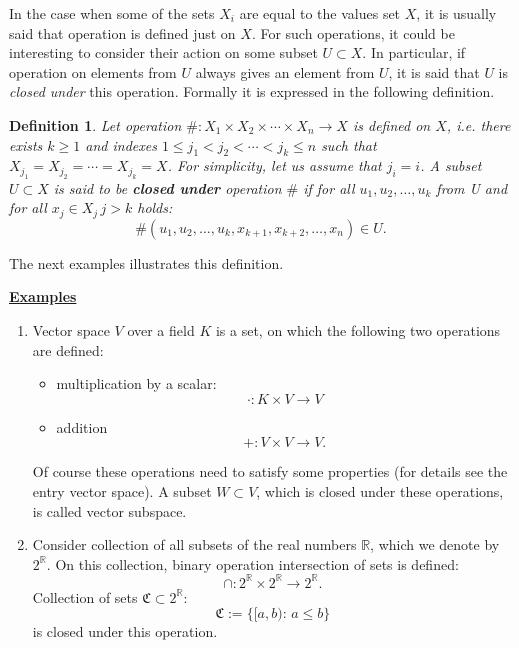 \documentclass[12pt]{article}
\newtheorem{dfn}{Definition}
\begin{document}
In the case when some of the sets $X_i$ are equal to the values set $X$, it is usually said
that operation is defined just on $X$. For such operations, it could be interesting
to consider their action on some subset $U\subset X$. In particular,
if operation on elements from $U$ always gives an element from $U$, it is said that $U$
is \textit{closed under} this operation. Formally it is expressed in the following definition.

\begin{dfn}
    Let operation $\#\colon X_1\times X_2\times\cdots\times X_n \longrightarrow X$ is defined
    on $X$, i.e. there exists $k\geq 1$ and indexes $1\leq j_1 < j_2 < \cdots < j_k\leq n$
    such that $X_{j_1}=X_{j_2}=\cdots=X_{j_k}=X$. For simplicity, let us assume that $j_i=i$.
    A subset $U\subset X$ is said to be \textbf{closed under} operation $\#$ if
    for all $u_1,u_2,\ldots,u_k$ from U and for all $x_j\in X_j\, j>k$ holds:
    $$
        \#(u_1,u_2,\ldots,u_k,x_{k+1},x_{k+2},\ldots,x_n)\in U.
    $$
\end{dfn}
%
\noindent
The next examples illustrates this definition.

\vspace{0.5cm}
\noindent
\underline{\textbf{Examples}}
\begin{enumerate}
\item Vector space $V$ over a field $K$ is a set, on which the following two operations
    are defined:
    \begin{itemize}
    \item multiplication by a scalar:
        $$
            \cdot\colon K\times V\longrightarrow V
        $$

    \item addition
        $$
            +\colon V\times V \longrightarrow V.
        $$
    \end{itemize}
    Of course these operations need to satisfy some properties (for details see the entry vector space).
    A subset $W\subset V$, which is closed under these operations, is called vector subspace.

\item Consider collection of all subsets of the real numbers $\mathbb{R}$, which we denote by $2^\mathbb{R}$.
    On this collection, binary operation intersection of sets is defined:
    $$
        \cap\colon 2^\mathbb{R} \times 2^\mathbb{R} \longrightarrow 2^\mathbb{R}.
    $$
    Collection of sets $\mathfrak{C}\subset 2^\mathbb{R}$:
    $$
        \mathfrak{C}:=\{ [a,b) \colon \, a\leq b \}
    $$
    is closed under this operation.
\end{enumerate}
\end{document}
